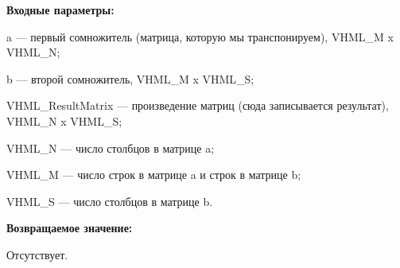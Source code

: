 \textbf{Входные параметры:}
 
a --- первый сомножитель (матрица, которую мы транспонируем), VHML\_M x VHML\_N;
 
b --- второй сомножитель, VHML\_M x VHML\_S;
 
VHML\_ResultMatrix --- произведение матриц (сюда записывается результат), VHML\_N x VHML\_S;
 
VHML\_N --- число столбцов в матрице a;
 
VHML\_M --- число строк в матрице a и строк в матрице b;
 
VHML\_S --- число столбцов в матрице b.

\textbf{Возвращаемое значение:}

Отсутствует.